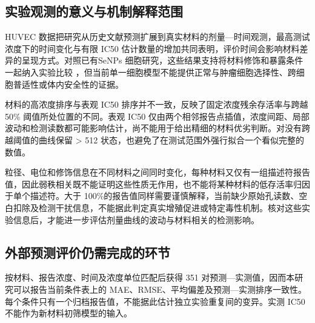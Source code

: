 \subsection{实验观测的意义与机制解释范围}

HUVEC 数据把研究从历史文献预测扩展到真实材料的剂量—时间观测，最高测试浓度下的时间变化与有限 IC50 估计数量的增加共同表明，评价时间会影响材料差异的呈现方式。对照已有SeNPs 细胞研究，这些结果支持将材料修饰和暴露条件一起纳入实验比较 \cite{wang2020prooxidation,lunkov2023chitosan}，但当前单一细胞模型不能提供正常与肿瘤细胞选择性、跨细胞普适性或体内安全性的证据。

材料的高浓度排序与表观 IC50 排序并不一致，反映了固定浓度残余存活率与跨越 50\% 阈值所处位置的不同。表观 IC50 仅由两个相邻报告点插值，浓度间距、局部波动和检测读数都可能影响估计，尚不能用于给出精细的材料优劣判断。对没有跨越阈值的曲线保留 > 512 状态，也避免了在测试范围外强行拟合一个看似完整的数值。

粒径、电位和修饰信息在不同材料之间同时变化，每种材料又仅有一组描述符报告值，因此弱秩相关既不能证明这些性质无作用，也不能将某种材料的低存活率归因于单个描述符。大于 100\%的报告值同样需要谨慎解释，当前缺少原始孔读数、空白扣除及检测干扰信息，不能据此判定真实增殖促进或特定毒性机制。核对这些实验信息后，才能进一步评估剂量曲线的波动与材料相关的检测影响。

\subsection{外部预测评价仍需完成的环节}

按材料、报告浓度、时间及浓度单位匹配后获得 351 对预测—实测值，因而本研究可以报告当前条件表上的 MAE、RMSE、平均偏差及预测—实测排序一致性。每个条件只有一个归档报告值，不能据此估计独立实验重复间的变异。实测 IC50 不能作为新材料初筛模型的输入。
